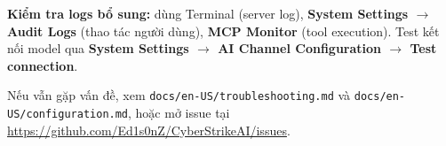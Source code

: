 \documentclass[11pt,a4paper]{article}
\newcommand{\ccode}[1]{\texttt{\small #1}}
\begin{document}
\textbf{Kiểm tra logs bổ sung:} dùng Terminal (server log), \textbf{System Settings $\rightarrow$ Audit Logs} (thao tác người dùng), \textbf{MCP Monitor} (tool execution). Test kết nối model qua \textbf{System Settings $\rightarrow$ AI Channel Configuration $\rightarrow$ Test connection}.

Nếu vẫn gặp vấn đề, xem \ccode{docs/en-US/troubleshooting.md} và \ccode{docs/en-US/configuration.md}, hoặc mở issue tại \url{https://github.com/Ed1s0nZ/CyberStrikeAI/issues}.
\end{document}
